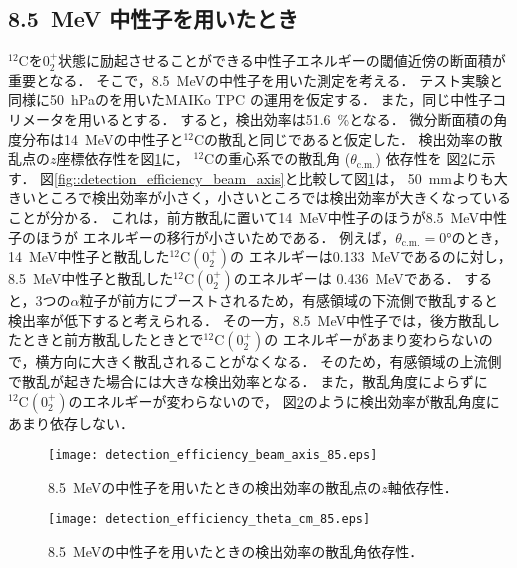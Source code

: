 \documentclass[../master]{subfiles}
\begin{document}
\subsection{8.5~MeV 中性子を用いたとき}
${}^{12}\mathrm{C}$を$0_2^+$状態に励起させることができる中性子エネルギーの閾値近傍の断面積が重要となる．
そこで，\SI{8.5}{\mega\electronvolt}の中性子を用いた測定を考える．
テスト実験と同様に\SI{50}{\hecto\pascal}の\isoButaneHydro を用いたMAIKo TPC の運用を仮定する．
また，同じ中性子コリメータを用いるとする．
すると，検出効率は\SI{51.6}{\percent}となる．
微分断面積の角度分布は\SI{14}{\mega\electronvolt}の中性子と${}^{12}\mathrm{C}$の散乱と同じであると仮定した．
検出効率の散乱点の$z$座標依存性を図\ref{fig::detection_efficiency_beam_axis_low}に，
${}^{12}\mathrm{C}$の重心系での散乱角 ($\theta_{\text{c.m.}}$) 依存性を
図\ref{fig::detection_efficiency_theta_cm_low}に示す．
図\ref{fig::detection_efficiency_beam_axis}と比較して図\ref{fig::detection_efficiency_beam_axis_low}は，
\SI{50}{\milli\metre}よりも大きいところで検出効率が小さく，小さいところでは検出効率が大きくなっていることが分かる．
これは，前方散乱に置いて\SI{14}{\mega\electronvolt}中性子のほうが\SI{8.5}{\mega\electronvolt}中性子のほうが
エネルギーの移行が小さいためである．
例えば，$\theta_{\text{c.m.}} = \ang{0}$のとき，
\SI{14}{\mega\electronvolt}中性子と散乱した${}^{12}\mathrm{C}(0_2^+)$の
エネルギーは\SI{0.133}{\mega\electronvolt}であるのに対し，
\SI{8.5}{\mega\electronvolt}中性子と散乱した${}^{12}\mathrm{C}(0_2^+)$のエネルギーは
\SI{0.436}{\mega\electronvolt}である．
すると，3つの$\alpha$粒子が前方にブーストされるため，有感領域の下流側で散乱すると検出率が低下すると考えられる．
その一方，\SI{8.5}{\mega\electronvolt}中性子では，後方散乱したときと前方散乱したときとで${}^{12}\mathrm{C}(0_2^+)$の
エネルギーがあまり変わらないので，横方向に大きく散乱されることがなくなる．
そのため，有感領域の上流側で散乱が起きた場合には大きな検出効率となる．
また，散乱角度によらずに${}^{12}\mathrm{C}(0_2^+)$のエネルギーが変わらないので，
図\ref{fig::detection_efficiency_theta_cm_low}のように検出効率が散乱角度にあまり依存しない．
\begin{figure}
  \centering
  \texttt{[image: detection\_efficiency\_beam\_axis\_85.eps]}
  \caption{\SI{8.5}{\mega\electronvolt}の中性子を用いたときの検出効率の散乱点の$z$軸依存性．}
  \label{fig::detection_efficiency_beam_axis_low}
\end{figure}
\begin{figure}
  \centering
  \texttt{[image: detection\_efficiency\_theta\_cm\_85.eps]}
  \caption{\SI{8.5}{\mega\electronvolt}の中性子を用いたときの検出効率の散乱角依存性．}
  \label{fig::detection_efficiency_theta_cm_low}
\end{figure}
\end{document}
